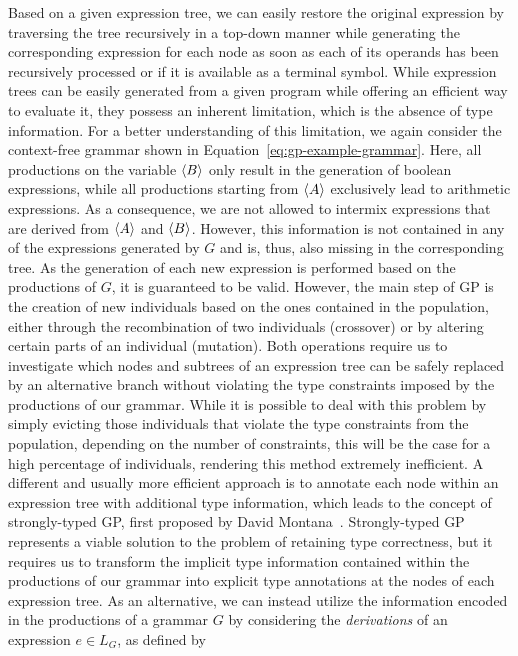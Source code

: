 Based on a given expression tree, we can easily restore the original expression by traversing the tree recursively in a top-down manner while generating the corresponding expression for each node as soon as each of its operands has been recursively processed or if it is available as a terminal symbol.
While expression trees can be easily generated from a given program while offering an efficient way to evaluate it, they possess an inherent limitation, which is the absence of type information.
For a better understanding of this limitation, we again consider the context-free grammar shown in Equation~\eqref{eq:gp-example-grammar}.
Here, all productions on the variable $\langle B \rangle$ only result in the generation of boolean expressions, while all productions starting from $\langle A \rangle$ exclusively lead to arithmetic expressions.
As a consequence, we are not allowed to intermix expressions that are derived from $\langle A \rangle$ and $\langle B \rangle$.
However, this information is not contained in any of the expressions generated by $G$ and is, thus, also missing in the corresponding tree.
As the generation of each new expression is performed based on the productions of $G$, it is guaranteed to be valid.
However, the main step of GP is the creation of new individuals based on the ones contained in the population, either through the recombination of two individuals (crossover) or by altering certain parts of an individual (mutation). 
Both operations require us to investigate which nodes and subtrees of an expression tree can be safely replaced by an alternative branch without violating the type constraints imposed by the productions of our grammar.
While it is possible to deal with this problem by simply evicting those individuals that violate the type constraints from the population, depending on the number of constraints, this will be the case for a high percentage of individuals, rendering this method extremely inefficient.
A different and usually more efficient approach is to annotate each node within an expression tree with additional type information, which leads to the concept of strongly-typed GP, first proposed by David Montana~\cite{montana1995strongly}.
Strongly-typed GP represents a viable solution to the problem of retaining type correctness, but it requires us to transform the implicit type information contained within the productions of our grammar into explicit type annotations at the nodes of each expression tree.
As an alternative, we can instead utilize the information encoded in the productions of a grammar $G$ by considering the \emph{derivations} of an expression $e \in L_G$, as defined by
